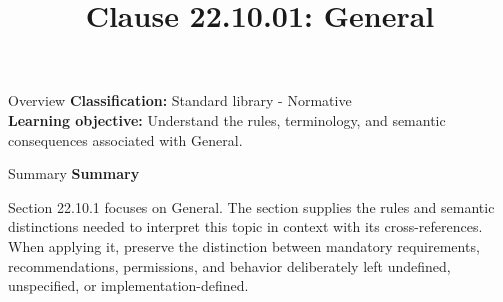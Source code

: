 \documentclass[10pt,letterpaper]{article}
\title{Clause 22.10.01: General}
\author{}
\date{}
\begin{document}
\maketitle
\begin{CornellOverviewBox}{Overview}
\textbf{Classification:} Standard library - Normative\\[2pt]
\textbf{Learning objective:} Understand the rules, terminology, and semantic consequences associated with General.
\end{CornellOverviewBox}\begin{CornellSummaryBox}{Summary}
{\sffamily\bfseries\color{Accent} Summary}\par\vspace{3pt}Section 22.10.1 focuses on General. The section supplies the rules and semantic distinctions needed to interpret this topic in context with its cross-references. When applying it, preserve the distinction between mandatory requirements, recommendations, permissions, and behavior deliberately left undefined, unspecified, or implementation-defined.
\end{CornellSummaryBox}
\end{document}

